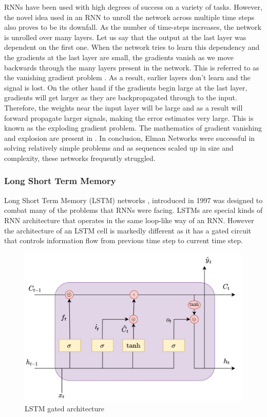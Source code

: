 \documentclass{article}
\begin{document}
RNNs have been used with high degrees of success on a variety of tasks. However, the novel idea used in an RNN to unroll the network across multiple time steps also proves to be its downfall. As the number of time-steps increases, the network is unrolled over many layers. Let us say that the output at the last layer was dependent on the first one. When the network tries to learn this dependency and the gradients at the last layer are small, the gradients vanish as we move backwards through the many layers present in the network.  This is referred to as the vanishing gradient problem \cite{pascanu_difficulty_2013}. As a result, earlier layers don't learn and the signal is lost. On the other hand if the gradients begin large at the last layer, gradients will get larger as they are backpropagated through to the input. Therefore, the weights near the input layer will be large and as a result will forward propagate larger signals, making the error estimates very large. This is known as the exploding gradient problem. The mathematics of gradient vanishing and explosion are present in \cite{pascanu_difficulty_2013}. In conclusion, Elman Networks were successful in solving relatively simple problems and as sequences scaled up in size and complexity, these networks frequently struggled. 

\subsubsection{Long Short Term Memory}
Long Short Term Memory (LSTM) networks \cite{HochSchm97}, introduced in 1997 was designed to combat many of the problems that RNNs were facing. LSTMs are special kinds of RNN architecture that operates in the same loop-like way of an RNN. However the architecture of an LSTM cell is markedly different as it has a gated circuit that controls information flow from previous time step to current time step.
\begin{figure}[H]
\centering
\includegraphics[scale=0.4]{theory/lstm-cell.png}
\caption{LSTM gated architecture}
\label{fig:lstm}
\end{figure}
\end{document}
